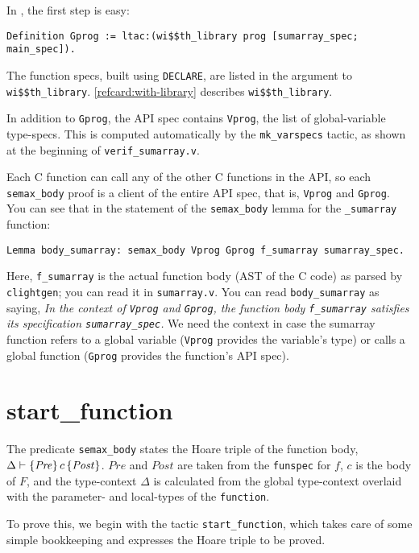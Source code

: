 \documentclass[12pt,fleqn,openany,oneside,showtrims]{memoir}
\begin{document}
In , the first step is easy:
\label{refcard:with-library1}
\begin{lstlisting}
Definition Gprog := ltac:(wi$$th_library prog [sumarray_spec; main_spec]).
\end{lstlisting}
The function specs, built using \lstinline{DECLARE},
are listed in the argument to \lstinline{wi$$th_library}.
\autoref{refcard:with-library} describes \lstinline{wi$$th_library}.

In addition to \lstinline{Gprog},
the API spec contains \lstinline{Vprog}, the list of
global-variable type-specs.  This is computed automatically
by the \lstinline{mk_varspecs} tactic, as shown at the
beginning of \lstinline{verif_sumarray.v}.

Each C function can call any of the other C functions
in the API, so each \lstinline{semax_body} proof
is a client of the entire API spec, that is,
\lstinline{Vprog} and \lstinline{Gprog}.
You can see that in the statement of the
\lstinline{semax_body} lemma for the \lstinline{_sumarray}
function:
\begin{lstlisting}
Lemma body_sumarray: semax_body Vprog Gprog f_sumarray sumarray_spec.
\end{lstlisting}
Here, \lstinline{f_sumarray} is the actual function body
(AST of the C code) as parsed by \lstinline{clightgen};
you can read it in \lstinline{sumarray.v}.
You can read \lstinline{body_sumarray} as saying,
\emph{In the context of \lstinline{Vprog} and \lstinline{Gprog},
  the function body \lstinline{f_sumarray}
  satisfies its specification \lstinline{sumarray_spec}.}
We need the context in case the sumarray function
refers to a global variable (\lstinline{Vprog} provides
the variable's type)
or calls a global function
 (\lstinline{Gprog} provides
the function's API spec).

\chapter{\upshape\textsf{start\_function}}
\label{refcard:start-function}
The predicate \lstinline{semax_body}
states the Hoare triple of the function body,
$\Delta\vdash \{\mathit{Pre}\}\,c\,\{\mathit{Post}\}$.
$\mathit{Pre}$ and $\mathit{Post}$ are taken from the \lstinline{funspec}
for $f$, $c$ is the body of $F$,
and the type-context $\Delta$ is calculated from the global type-context
overlaid with the parameter- and local-types of the  \lstinline{function}.

To prove this, we begin with the tactic \lstinline{start_function},
which takes care of some simple bookkeeping and
expresses the Hoare triple to be proved.
\end{document}
